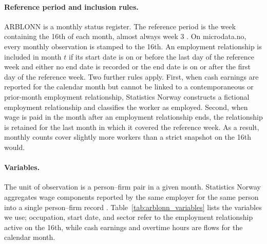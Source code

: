 \documentclass[12pt]{article}
\begin{document}
\paragraph{Reference period and inclusion rules.}
ARBLONN is a monthly status register. The reference period is the week containing the 16th of each month, almost always week 3 \citep{ssb_klassifisering}. On microdata.no, every monthly observation is stamped to the 16th. An employment relationship is included in month $t$ if its start date is on or before the last day of the reference week and either no end date is recorded or the end date is on or after the first day of the reference week. Two further rules apply. First, when cash earnings are reported for the calendar month but cannot be linked to a contemporaneous or prior-month employment relationship, Statistics Norway constructs a fictional employment relationship and classifies the worker as employed. Second, when wage is paid in the month after an employment relationship ends, the relationship is retained for the last month in which it covered the reference week. As a result, monthly counts cover slightly more workers than a strict snapshot on the 16th would.

\paragraph{Variables.}
The unit of observation is a person--firm pair in a given month. Statistics Norway aggregates wage components reported by the same employer for the same person into a single person--firm record \citep{ssb_klassifisering}. Table~\ref{tab:arblonn_variables} lists the variables we use; occupation, start date, and sector refer to the employment relationship active on the 16th, while cash earnings and overtime hours are flows for the calendar month.
\end{document}
